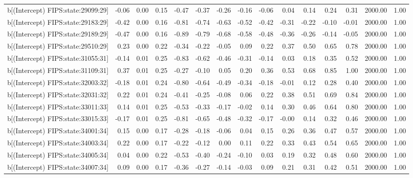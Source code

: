 \begin{table}[ht]
\begin{tabular}{rrrrrrrrrrrrrrr}
  b[(Intercept) FIPS:state:29099:29] & -0.06 & 0.00 & 0.15 & -0.47 & -0.37 & -0.26 & -0.16 & -0.06 & 0.04 & 0.14 & 0.24 & 0.31 & 2000.00 & 1.00 \\ 
  b[(Intercept) FIPS:state:29183:29] & -0.42 & 0.00 & 0.16 & -0.81 & -0.74 & -0.63 & -0.52 & -0.42 & -0.31 & -0.22 & -0.10 & -0.01 & 2000.00 & 1.00 \\ 
  b[(Intercept) FIPS:state:29189:29] & -0.47 & 0.00 & 0.16 & -0.89 & -0.79 & -0.68 & -0.58 & -0.48 & -0.36 & -0.26 & -0.14 & -0.05 & 2000.00 & 1.00 \\ 
  b[(Intercept) FIPS:state:29510:29] & 0.23 & 0.00 & 0.22 & -0.34 & -0.22 & -0.05 & 0.09 & 0.22 & 0.37 & 0.50 & 0.65 & 0.78 & 2000.00 & 1.00 \\ 
  b[(Intercept) FIPS:state:31055:31] & -0.14 & 0.01 & 0.25 & -0.83 & -0.62 & -0.46 & -0.31 & -0.14 & 0.03 & 0.18 & 0.35 & 0.52 & 2000.00 & 1.00 \\ 
  b[(Intercept) FIPS:state:31109:31] & 0.37 & 0.01 & 0.25 & -0.27 & -0.10 & 0.05 & 0.20 & 0.36 & 0.53 & 0.68 & 0.85 & 1.00 & 2000.00 & 1.00 \\ 
  b[(Intercept) FIPS:state:32003:32] & -0.18 & 0.01 & 0.24 & -0.80 & -0.64 & -0.49 & -0.34 & -0.18 & -0.01 & 0.12 & 0.28 & 0.40 & 2000.00 & 1.00 \\ 
  b[(Intercept) FIPS:state:32031:32] & 0.22 & 0.01 & 0.24 & -0.41 & -0.25 & -0.08 & 0.06 & 0.22 & 0.38 & 0.51 & 0.69 & 0.84 & 2000.00 & 1.00 \\ 
  b[(Intercept) FIPS:state:33011:33] & 0.14 & 0.01 & 0.25 & -0.53 & -0.33 & -0.17 & -0.02 & 0.14 & 0.30 & 0.46 & 0.64 & 0.80 & 2000.00 & 1.00 \\ 
  b[(Intercept) FIPS:state:33015:33] & -0.17 & 0.01 & 0.25 & -0.81 & -0.65 & -0.48 & -0.32 & -0.17 & -0.00 & 0.14 & 0.32 & 0.46 & 2000.00 & 1.00 \\ 
  b[(Intercept) FIPS:state:34001:34] & 0.15 & 0.00 & 0.17 & -0.28 & -0.18 & -0.06 & 0.04 & 0.15 & 0.26 & 0.36 & 0.47 & 0.57 & 2000.00 & 1.00 \\ 
  b[(Intercept) FIPS:state:34003:34] & 0.22 & 0.00 & 0.17 & -0.22 & -0.12 & 0.00 & 0.11 & 0.22 & 0.33 & 0.43 & 0.54 & 0.65 & 2000.00 & 1.00 \\ 
  b[(Intercept) FIPS:state:34005:34] & 0.04 & 0.00 & 0.22 & -0.53 & -0.40 & -0.24 & -0.10 & 0.03 & 0.19 & 0.32 & 0.48 & 0.60 & 2000.00 & 1.00 \\ 
  b[(Intercept) FIPS:state:34007:34] & 0.09 & 0.00 & 0.17 & -0.36 & -0.27 & -0.14 & -0.03 & 0.09 & 0.21 & 0.31 & 0.42 & 0.51 & 2000.00 & 1.00 \\ 

\end{tabular}
\end{table}
